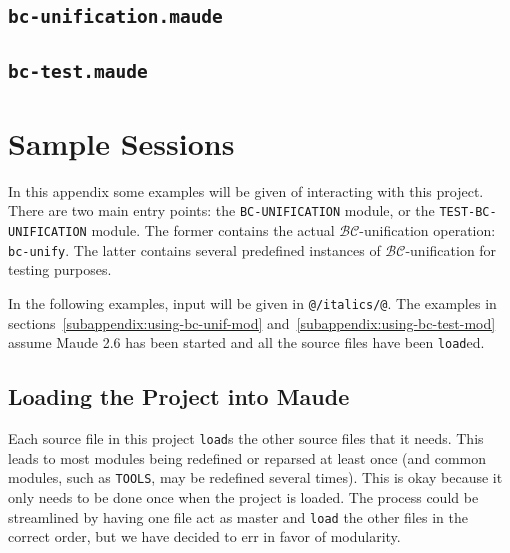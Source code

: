 \documentclass[11pt]{article}
\newcommand{\BC}{\mathcal{BC}}
\newcommand{\TitleListing}[1]{\texorpdfstring{\lstinline|#1|}{#1}}
\begin{document}
\subsection{\TitleListing{bc-unification.maude}}
\label{subappendix:bc-unif-mod}

\clearpage

\subsection{\TitleListing{bc-test.maude}}
\label{subappendix:test-mod}


\clearpage
\section{Sample Sessions}\label{appendix:samples}

In this appendix some examples will be given of interacting with this project.
There are two main entry points: the \lstinline|BC-UNIFICATION| module, or the
\lstinline|TEST-BC-UNIFICATION| module. The former contains the actual
$\BC$-unification operation: \lstinline|bc-unify|. The latter contains several
predefined instances of $\BC$-unification for testing purposes.

In the following examples, input will be given in \lstinline|@/italics/@|. The
examples in sections~\ref{subappendix:using-bc-unif-mod}
and~\ref{subappendix:using-bc-test-mod} assume Maude 2.6 has been started and
all the source files have been \lstinline|load|ed.

\subsection{Loading the Project into Maude}\label{subappendix:loading}

Each source file in this project \lstinline|load|s the other source files that
it needs. This leads to most modules being redefined or reparsed at least once
(and common modules, such as \lstinline|TOOLS|, may be redefined several
times). This is okay because it only needs to be done once when the project is
loaded. The process could be streamlined by having one file act as master and
\lstinline|load| the other files in the correct order, but we have decided to
err in favor of modularity.
\vspace{1ex}


\end{document}

